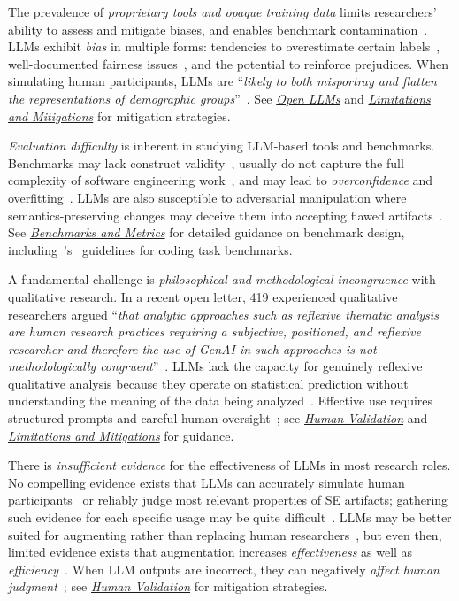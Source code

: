 \documentclass[smallextended]{svjour3}
\newcommand*{\enq}[1]{\enquote{{\itshape#1}}}
\newcommand{\benchmarksmetrics}{\hyperref[sec:use-suitable-baselines-benchmarks-and-metrics]{\emph{Benchmarks and Metrics}}\xspace}
\newcommand{\openllm}{\hyperref[sec:use-an-open-llm-as-a-baseline]{\emph{Open LLMs}}\xspace}
\newcommand{\humanvalidation}{\hyperref[sec:use-human-validation-for-llm-outputs]{\emph{Human Validation}}\xspace}
\newcommand{\limitationsmitigations}{\hyperref[sec:report-limitations-and-mitigations]{\emph{Limitations and Mitigations}}\xspace}
\newcommand{\benchmarksmetrics}{\href{/guidelines\#use-suitable-baselines-benchmarks-and-metrics}{\emph{Benchmarks and Metrics}}\xspace}
\newcommand{\openllm}{\href{/guidelines\#use-an-open-llm-as-a-baseline}{\emph{Open LLMs}}\xspace}
\newcommand{\humanvalidation}{\href{/guidelines\#use-human-validation-for-llm-outputs}{\emph{Human Validation}}\xspace}
\newcommand{\limitationsmitigations}{\href{/guidelines\#report-limitations-and-mitigations}{\emph{Limitations and Mitigations}}\xspace}
\begin{document}
The prevalence of \emph{proprietary tools and opaque training data} limits researchers' ability to assess and mitigate biases, and enables benchmark contamination~\cite{DBLP:journals/corr/abs-2410-16186}. LLMs exhibit \emph{bias} in multiple forms: tendencies to overestimate certain labels~\cite{DBLP:journals/corr/abs-2304-10145}, well-documented fairness issues~\cite{DBLP:journals/coling/GallegosRBTKDYZA24}, and the potential to reinforce prejudices. When simulating human participants, LLMs are \enq{likely to both misportray and flatten the representations of demographic groups}~\cite{DBLP:journals/natmi/WangMD25}. See \openllm and \limitationsmitigations for mitigation strategies.

\emph{Evaluation difficulty} is inherent in studying LLM-based tools and benchmarks. Benchmarks may lack construct validity~\cite{DBLP:books/sp/24/RalphKAA24}, usually do not capture the full complexity of software engineering work~\cite{Chandra2025benchmarks}, and may lead to \emph{overconfidence} and overfitting~\cite{DBLP:conf/kdd/WanSJKCNSSWYABJ24}. LLMs are also susceptible to adversarial manipulation where semantics-preserving changes may deceive them into accepting flawed artifacts~\cite{DBLP:journals/corr/abs-2510-24367}. See \benchmarksmetrics for detailed guidance on benchmark design, including~\citeauthor{cao2025should}'s~\cite{cao2025should} guidelines for coding task benchmarks.

A fundamental challenge is \emph{philosophical and methodological incongruence} with qualitative research. In a recent open letter, 419 experienced qualitative researchers argued \enq{that analytic approaches such as reflexive thematic analysis are human research practices requiring a subjective, positioned, and reflexive researcher and therefore the use of GenAI in such approaches is not methodologically congruent}~\cite{jowsey2025reject}. LLMs lack the capacity for genuinely reflexive qualitative analysis because they operate on statistical prediction without understanding the meaning of the data being analyzed~\cite{DBLP:journals/corr/abs-2306-13298, DBLP:journals/corr/abs-2510-18456}. Effective use requires structured prompts and careful human oversight~\cite{DBLP:conf/wsese/BarrosANKKNB25}; see \humanvalidation and \limitationsmitigations for guidance.

There is \emph{insufficient evidence} for the effectiveness of LLMs in most research roles. No compelling evidence exists that LLMs can accurately simulate human participants~\cite{DBLP:journals/corr/abs-2508-06950} or reliably judge most relevant properties of SE artifacts; gathering such evidence for each specific usage may be quite difficult~\cite{DBLP:journals/ais/HardingDLL24}. LLMs may be better suited for augmenting rather than replacing human researchers~\cite{DBLP:conf/emnlp/WangLXZZ21, DBLP:conf/chi/HeHDRH24}, but even then, limited evidence exists that augmentation increases \emph{effectiveness} as well as \emph{efficiency}~\cite{DBLP:journals/corr/abs-2508-06950}. When LLM outputs are incorrect, they can negatively \emph{affect human judgment}~\cite{DBLP:conf/www/HuangKA23a, panHumanCenteredDesignRecommendations2024}; see \humanvalidation for mitigation strategies.
\end{document}
